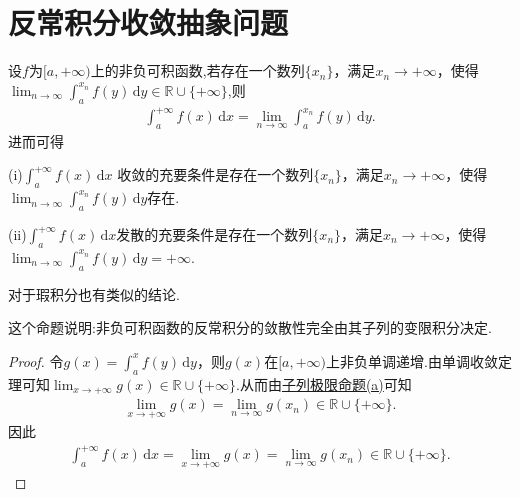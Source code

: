 \documentclass[../../main.tex]{subfiles}%
\begin{document}
\section{反常积分收敛抽象问题}

\begin{proposition}\label{proposition:反常积分收敛的基本结论2}
设$f$为$[a,+\infty)$上的非负可积函数,若存在一个数列$\{x_n\}$，满足$x_n\to+\infty$，使得$\lim_{n\to\infty}\int_a^{x_n}f(y)\,\mathrm{d}y\in \mathbb{R}\cup \{+\infty\}$,则
\begin{align*}
\int_a^{+\infty}f(x)\,\mathrm{d}x=\lim_{n\to\infty}\int_a^{x_n}f(y)\,\mathrm{d}y.
\end{align*}
进而可得

(i)$\int_a^{+\infty}f(x)\,\mathrm{d}x$ 收敛的充要条件是存在一个数列$\{x_n\}$，满足$x_n\to+\infty$，使得$\lim_{n\to\infty}\int_a^{x_n}f(y)\,\mathrm{d}y$存在.

(ii)$\int_a^{+\infty}f(x)\,\mathrm{d}x$发散的充要条件是存在一个数列$\{x_n\}$，满足$x_n\to+\infty$，使得$\lim_{n\to\infty}\int_a^{x_n}f(y)\,\mathrm{d}y=+\infty$.
\end{proposition}
\begin{remark}
对于瑕积分也有类似的结论.
\end{remark}
\begin{note}
这个命题说明:非负可积函数的反常积分的敛散性完全由其子列的变限积分决定.
\end{note}
\begin{proof}
令$g(x)=\int_a^xf(y)\,\mathrm{d}y$，则$g(x)$在$[a,+\infty)$上非负单调递增.由单调收敛定理可知$\lim_{x\to+\infty}g(x)\in\mathbb{R}\cup\{+\infty\}$.从而由\hyperref[proposition:子列极限命题]{子列极限命题(a)}可知
\begin{align*}
\lim_{x\to+\infty}g(x)=\lim_{n\to\infty}g(x_n)\in \mathbb{R}\cup \{+\infty\}.
\end{align*}
因此
\begin{align*}
\int_a^{+\infty}f(x)\,\mathrm{d}x=\lim_{x\to+\infty}g(x)=\lim_{n\to\infty}g(x_n)\in \mathbb{R}\cup \{+\infty\}.
\end{align*}
\end{proof}
\end{document}
